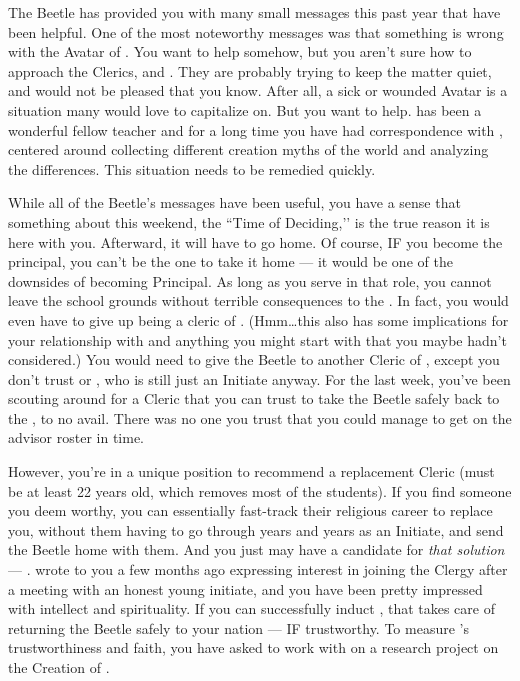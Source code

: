 \documentclass[char]{GL2020}
\begin{document}
The Beetle has provided you with many small messages this past year that have been helpful. One of the most noteworthy messages was that something is wrong with the Avatar of \cEbbFull{\full}. You want to help somehow, but you aren't sure how to approach the \pShippie{} Clerics, \cEbbPriest{\full} and \cFlowPriest{\full}. They are probably trying to keep the matter quiet, and would not be pleased that you know. After all, a sick or wounded Avatar is a situation many would love to capitalize on. But you want to help. \cFlowPriest{} has been a wonderful fellow teacher and for a long time you have had correspondence with \cEbbPriest{}, centered around collecting different creation myths of the world and analyzing the differences. This situation needs to be remedied quickly.

While all of the Beetle's messages have been useful, you have a sense that something about this weekend, the ``Time of Deciding,’’ is the true reason it is here with you. Afterward, it will have to go home. Of course, IF you become the principal, you can't be the one to take it home — it would be one of the downsides of becoming Principal. As long as you serve in that role, you cannot leave the school grounds without terrible consequences to the \pSc{}. In fact, you would even have to give up being a cleric of \cTechGod{}. (Hmm\ldots this also has some implications for your relationship with \cJuniorStatesman{} and anything you might start with \cEthics{} that you maybe hadn’t considered.) You would need to give the Beetle to another Cleric of \cTechGod{}, except you don't trust \cAntiChup{} or \cScholarship{}, who is still just an Initiate anyway. For the last week, you've been scouting around for a Cleric that you can trust to take the Beetle safely back to the \pTech{}, to no avail. There was no one you trust that you could manage to get on the advisor roster in time. 

However, you're in a unique position to recommend a replacement Cleric (must be at least 22 years old, which removes most of the students). If you find someone you deem worthy, you can essentially fast-track their religious career to replace you, without them having to go through years and years as an Initiate, and send the Beetle home with them. And you just may have a candidate for \emph{that solution} — \cHeadScientist{\full}. \cHeadScientist{} wrote to you a few months ago expressing interest in joining the Clergy after a meeting with an honest young initiate, and you have been pretty impressed with \cHeadScientist{\their} intellect and spirituality. If you can successfully induct \cHeadScientist{}, that takes care of returning the Beetle safely to your nation — IF \cHeadScientist{\they} \cHeadScientist{\are} trustworthy. To measure \cHeadScientist{}'s trustworthiness and faith, you have asked  \cHeadScientist{\them} to work with \cEbbPriest{} on a research project on the Creation of \pEarth{}. 
\end{document}
